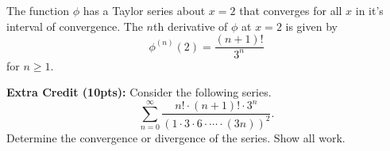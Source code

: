 \documentclass[addpoints]{exam}
\begin{document}
\begin{questions}
\begin{parts}
	\end{parts}

	\newpage

	\question The function $\phi$ has a Taylor series about $x=2$ that converges for all $x$ in it's interval of convergence. The $n$th derivative of $\phi$ at $x=2$ is given by \[\phi^{(n)}(2)=\frac{(n+1)!}{3^n}\] for $n\ge1$.


\end{questions}

\newpage

\noindent\textbf{Extra Credit (10pts):} Consider the following series. \[\sum_{n=0}^\infty\frac{n!\cdot(n+1)!\cdot3^n}{\left(1\cdot3\cdot6\cdot\cdots\cdot(3n)\right)^2}.\] Determine the convergence or divergence of the series. Show all work.
\end{document}
